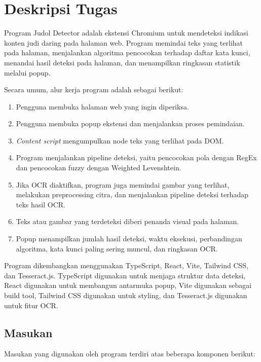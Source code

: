 \section{Deskripsi Tugas}

Program Judol Detector adalah ekstensi Chromium untuk mendeteksi indikasi
konten judi daring pada halaman web. Program memindai teks yang terlihat pada
halaman, menjalankan algoritma pencocokan terhadap daftar kata kunci, menandai
hasil deteksi pada halaman, dan menampilkan ringkasan statistik melalui popup.

Secara umum, alur kerja program adalah sebagai berikut:

\begin{enumerate}
    \item Pengguna membuka halaman web yang ingin diperiksa.
    \item Pengguna membuka popup ekstensi dan menjalankan proses pemindaian.
    \item \textit{Content script} mengumpulkan node teks yang terlihat pada DOM.
    \item Program menjalankan pipeline deteksi, yaitu pencocokan pola dengan
    RegEx dan pencocokan fuzzy dengan Weighted Levenshtein.
    \item Jika OCR diaktifkan, program juga memindai gambar yang terlihat,
    melakukan preprocessing citra, dan menjalankan pipeline deteksi terhadap
    teks hasil OCR.
    \item Teks atau gambar yang terdeteksi diberi penanda visual pada halaman.
    \item Popup menampilkan jumlah hasil deteksi, waktu eksekusi, perbandingan
    algoritma, kata kunci paling sering muncul, dan ringkasan OCR.
\end{enumerate}

Program dikembangkan menggunakan TypeScript, React, Vite, Tailwind CSS, dan
Tesseract.js. TypeScript digunakan untuk menjaga struktur data deteksi,
React digunakan untuk membangun antarmuka popup, Vite digunakan sebagai build
tool, Tailwind CSS digunakan untuk styling, dan Tesseract.js digunakan untuk
fitur OCR.

\subsection{Masukan}

Masukan yang digunakan oleh program terdiri atas beberapa komponen berikut:

